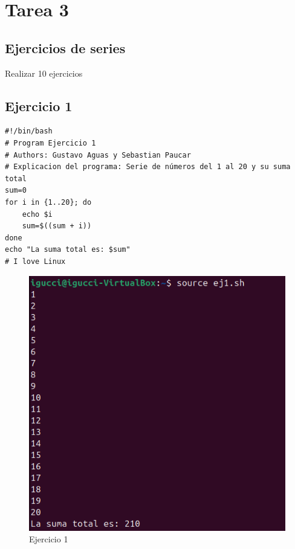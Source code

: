 \documentclass[11pt,twoside]{book}
\begin{document}
\section{Tarea 3}
\subsection{Ejercicios de series}
Realizar 10 ejercicios
\subsection{Ejercicio 1}
\begin{lstlisting}
#!/bin/bash
# Program Ejercicio 1
# Authors: Gustavo Aguas y Sebastian Paucar
# Explicacion del programa: Serie de números del 1 al 20 y su suma total
sum=0
for i in {1..20}; do
    echo $i
    sum=$((sum + i))
done
echo "La suma total es: $sum"
# I love Linux
\end{lstlisting}
\begin{figure}[h]
    \centering
    \includegraphics[width=0.6\linewidth]{series/ej1.png}
    \caption{Ejercicio 1}
\end{figure}

\newpage
\end{document}

